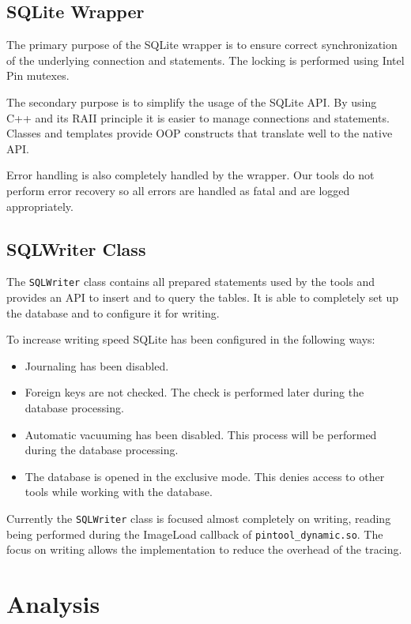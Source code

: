 \subsection{SQLite Wrapper}

The primary purpose of the SQLite wrapper is to ensure correct synchronization of the underlying connection and statements. The locking is performed using Intel Pin mutexes.

The secondary purpose is to simplify the usage of the SQLite API. By using C++ and its RAII principle it is easier to manage connections and statements. Classes and templates provide OOP constructs that translate well to the native API.

Error handling is also completely handled by the wrapper. Our tools do not perform error recovery so all errors are handled as fatal and are logged appropriately. 

\subsection{SQLWriter Class}
\label{sqlwriter}

The \texttt{SQLWriter} class contains all prepared statements used by the tools and provides an API to insert and to query the tables. It is able to completely set up the database and to configure it for writing.

To increase writing speed SQLite has been configured in the following ways:

\begin{itemize}
	\item Journaling has been disabled.
	\item Foreign keys are not checked. The check is performed later during the database processing.
	\item Automatic vacuuming has been disabled. This process will be performed during the database processing.
	\item The database is opened in the exclusive mode. This denies access to other tools while working with the database.
\end{itemize}

Currently the \texttt{SQLWriter} class is focused almost completely on writing, reading being performed during the ImageLoad callback of \texttt{pintool\_dynamic.so}. The focus on writing allows the implementation to reduce the overhead of the tracing.

\section{Analysis}

